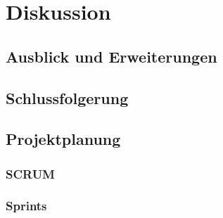 \documentclass[a4paper,twopage,ngerman,11pt]{scrreprt}
\begin{document}
	\part{Diskussion}
		\chapter{Ausblick und Erweiterungen}
		\chapter{Schlussfolgerung}



	\makeglossaries

	
	{}
	
	\appendix
	\chapter{Projektplanung}
		\section{SCRUM}
		\section{Sprints}
\end{document}
